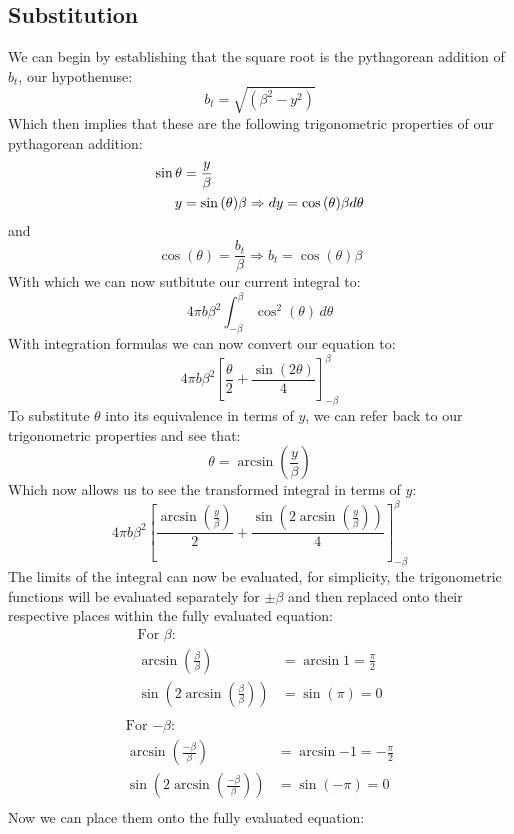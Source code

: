 \documentclass{article}
\begin{document}
	\subsection*{Substitution}
	We can begin by establishing that the square root is the pythagorean addition of $b_t$, our hypothenuse:
	\[b_t = \sqrt{(\beta^2 - y^2)}\]
	Which then implies that these are the following trigonometric properties of our pythagorean addition:
	\begin{align*}
		\sin{\theta} &= \frac{y}{\beta} \\
		y &=\sin{(\theta)} \beta  \Rightarrow dy =\cos{(\theta)}\beta \space d\theta \\
	\end{align*}
	and
		\[\cos{(\theta)} = \frac{b_t}{\beta}  \Rightarrow b_t = \cos{(\theta)}\beta\] 
	With which we can now sutbitute our current integral to:
	\[4\pi b \beta^2\int_{-\beta}^{\beta} \cos^2{(\theta)}\, d\theta\]
	With integration formulas we can now convert our equation to:
	\[4\pi b \beta^2\left[\frac{\theta}{2}+\frac{\sin{(2\theta)}}{4}\right]_{-\beta}^{\beta}\]
	To substitute $\theta$ into its equivalence in terms of $y$, we can refer back to our trigonometric properties and see that:
	\[\theta = \arcsin{\left(\frac{y}{\beta}\right)}\]
	Which now allows us to see the transformed integral in terms of $y$:
		\[4\pi b \beta^2\left[\frac{	\arcsin{\left(\frac{y}{\beta}\right)}}{2}+\frac{\sin{(2	\arcsin{\left(\frac{y}{\beta}\right)})}}{4}\right]_{-\beta}^{\beta}\]
	The limits of the integral can now be evaluated, for simplicity, the trigonometric functions will be evaluated separately for $\pm \beta$ and then replaced onto their respective places within the fully evaluated equation:
	\begin{align*}
		\text{For $\beta$:}\\
		\arcsin{\left(\frac{\beta}{\beta}\right)} &= \arcsin{1}=\frac{\pi}{2}\\
		\sin{\left(2\arcsin{\left(\frac{\beta}{\beta}\right)}\right)}&=\sin{(\pi)}=0\\
	\end{align*}
	\begin{align*}
		\text{For $-\beta$:}\\
		\arcsin{\left(\frac{-\beta}{\beta}\right)} &= \arcsin{-1}=-\frac{\pi}{2}\\
		\sin{\left(2\arcsin{\left(\frac{-\beta}{\beta}\right)}\right)}&=\sin{(-\pi)}=0\\
	\end{align*}
	Now we can place them onto the fully evaluated equation: 
\end{document}
